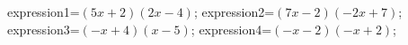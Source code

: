 \documentclass[exercice]{thedocument}%
\begin{document}
%
    \>expression1=$(5x+2)(2x-4)$;%
    \>expression2=$(7x-2)(-2x+7)$;%
    \>expression3=$(-x+4)(x-5)$;%
    \>expression4=$(-x-2)(-x+2)$;%
\end{document}
